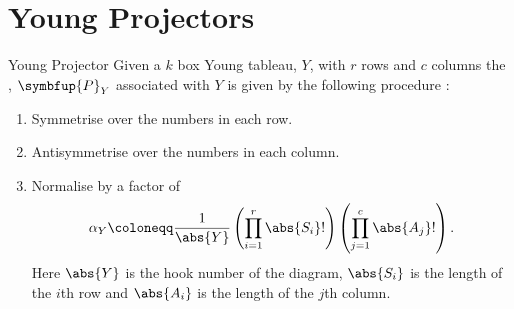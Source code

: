 \documentclass[fleqn]{NotesClass}
\newcommand{\projector}[1]{\symbfup{P}_{#1}}
\newcommand{\hooknumber}[1]{\abs{#1}}
\begin{document}
    \section{Young Projectors}
    \begin{dfn}{Young Projector}{}
        Given a \(k\) box Young tableau, \(Y\), with \(r\) rows and \(c\) columns the , \(\projector{Y}\) associated with \(Y\) is given by the following procedure \cite[91]{cvitanovic}:
        \begin{enumerate}
            \item Symmetrise over the numbers in each row.
            \item Antisymmetrise over the numbers in each column.
            \item Normalise by a factor of
            \begin{equation}
                \alpha_Y \coloneqq \frac{1}{\hooknumber{Y}} \left( \prod_{i=1}^{r} \abs{S_i}! \right) \left( \prod_{j=1}^{c} \abs{A_j}! \right).
            \end{equation}
            Here \(\hooknumber{Y}\) is the hook number of the diagram, \(\abs{S_i}\) is the length of the \(i\)th row and \(\abs{A_i}\) is the length of the \(j\)th column.
        \end{enumerate}
    \end{dfn}
    
\end{document}
